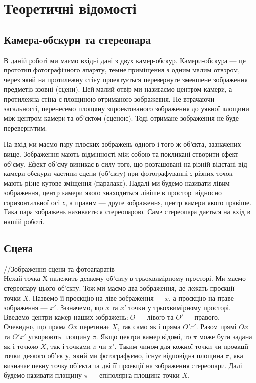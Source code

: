\chapter{Теоретичні відомості}


\section{Камера-обскури та стереопара}
В даній роботі ми маємо вхідні дані з двух камер-обскур. Камери-обскура --- 
це прототип фотографічного апарату, темне приміщення з одним малим отвором, 
через який на протилежну стіну проектується перевернуте зменшене зображення 
предметів ззовні (сцени). Цей малий отвір ми називаємо центром камери, а 
протилежна стіна є площиною отриманого зображення. Не втрачаючи загальності, 
перенесемо площину зпроектованого зображення до уявної площини між центром 
камери та об'єктом (сценою). Тоді отримане зображення не буде перевернутим.  

На вхід ми маємо пару плоских зображень одного і того ж об'єкта, зазначених вище.
Зображення мають відмінності між собою та покликані створити ефект об'єму. Ефект 
об'єму виникає в силу того, що розташовані на різній відстані від камери-обскури 
частини сцени (об'єкту) при фотографуванні з різних точок мають різне кутове 
зміщення (паралакс). Надалі ми будемо називати лівим --- зображення, центр камери
якого знаходиться лівіше в просторі відносно горизонтальної осі $х$, а правим ---
друге зображення, центр камери якого правіше. Така пара зображень називається 
стереопарою. Саме стереопара дається на вхід в нашій роботі.


\section{Сцена}
//Зображення сцени та фотоапаратів\\
Нехай точка $Х$ належить деякому об'єкту в трьохвимірному просторі. Ми маємо 
стереопару цього об'єкту. Тож ми маємо два зображення, де лежать проєкції точки 
$X$. Назвемо її проєкцію на ліве зображення --- $x$, а проєкцію на праве 
зображення --- $x'$. Зазначемо, що $x$ та $x'$ точки у трьохвимірному просторі. 
Введемо центри камер наших зображень: $O$ --- лівого та $O'$ --- правого. 
Очевидно, що пряма $Ox$ перетинає $X$, так само як і пряма $O'x'$. Разом прямі 
$Ox$ та $O'x'$ утворюють площину $\pi$. Якщо центри камер відомі, то $\pi$ може 
бути задана як і точкою $X$, так і точками $x$ чи $x'$. Таким чином для кожної
точки чи проекції точки деякого об'єкту, який ми фотографуємо, існує відповідна 
площина $\pi$, яка визначає певну точку об'єкта та дві її проекції на зображення 
стереопари. Далі будемо називати площину $\pi$ --- епіполярна площина точки $X$.



